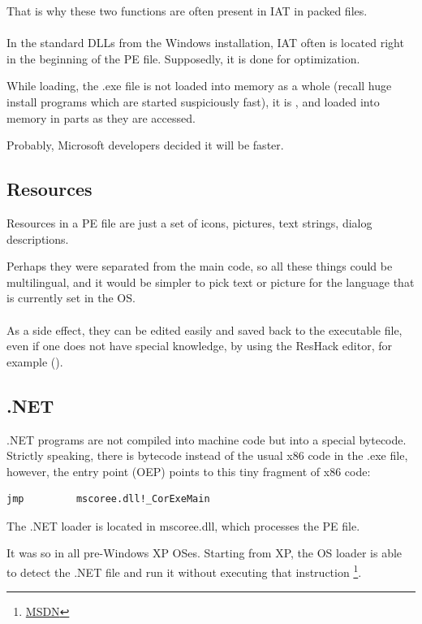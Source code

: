 That is why these two functions are often present in \ac{IAT} in packed files.\\
\\
In the standard DLLs from the Windows installation, \ac{IAT} often is located right in the beginning of the PE file.
Supposedly, it is done for optimization.

While loading, the .exe file is not loaded into memory as a whole (recall huge install programs which are
started suspiciously fast), it is , and loaded into memory in parts as they are accessed.

Probably, Microsoft developers decided it will be faster.

\subsection{Resources}

\label{PEresources}

Resources in a PE file are just a set of icons, pictures, text strings, dialog descriptions.

Perhaps they were separated from the main code, so all these things could be multilingual,
and it would be simpler to pick text or picture for the language that is currently set in the \ac{OS}. \\
\\
As a side effect, they can be edited easily and saved back to the executable file, even if one does not have special knowledge, 
by using the ResHack editor, for example ().

\subsection{.NET}


.NET programs are not compiled into machine code but into a special bytecode.
Strictly speaking, there is bytecode instead of the usual x86 code
in the .exe file, however, the entry point (\ac{OEP}) points to this tiny fragment of x86 code:

\begin{lstlisting}
jmp         mscoree.dll!_CorExeMain
\end{lstlisting}

The .NET loader is located in mscoree.dll, which processes the PE file.

It was so in all pre-Windows XP \ac{OS}es. Starting from XP, the \ac{OS} loader is able to detect the .NET file
and run it without executing that \JMP instruction
\footnote{\href{http://go.yurichev.com/17051}{MSDN}}.

